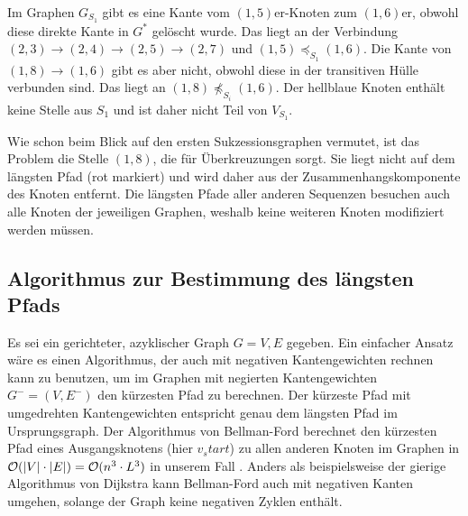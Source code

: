 \begin{center}
\end{center}

\vspace{-5pt}

Im Graphen $G_{S_1}$ gibt es eine Kante vom $(1,5)$er-Knoten zum $(1,6)$er, obwohl diese direkte Kante in $G^{*}$ gelöscht wurde. Das liegt an der Verbindung $(2,3) \rightarrow (2,4) \rightarrow (2,5) \rightarrow (2,7)$ und $(1,5) \preceq_{S_1} (1,6)$. Die Kante von $(1,8) \rightarrow (1,6)$ gibt es aber nicht, obwohl diese in der transitiven Hülle verbunden sind. Das liegt an $(1,8) \npreceq_{S_i} (1,6)$. Der hellblaue Knoten enthält keine Stelle aus $S_1$ und ist daher nicht Teil von $V_{S_1}$.

Wie schon beim Blick auf den ersten Sukzessionsgraphen vermutet, ist das Problem die Stelle $(1,8)$, die für Überkreuzungen sorgt. Sie liegt nicht auf dem längsten Pfad (rot markiert) und wird daher aus der Zusammenhangskomponente des Knoten entfernt. Die längsten Pfade aller anderen Sequenzen besuchen auch alle Knoten der jeweiligen Graphen, weshalb keine weiteren Knoten modifiziert werden müssen.

\subsection{Algorithmus zur Bestimmung des längsten Pfads}

Es sei ein gerichteter, azyklischer Graph $G = V,E$ gegeben. Ein einfacher Ansatz wäre es einen Algorithmus, der auch mit negativen Kantengewichten rechnen kann zu benutzen, um im Graphen mit negierten Kantengewichten $G^{-} = (V,E^{-})$ den kürzesten Pfad zu berechnen. Der kürzeste Pfad mit umgedrehten Kantengewichten entspricht genau dem längsten Pfad im Ursprungsgraph. Der Algorithmus von Bellman-Ford berechnet den kürzesten Pfad eines Ausgangsknotens (hier $v_start$) zu allen anderen Knoten im Graphen in $\mathcal{O}(|V|\cdot |E|) = \mathcal{O}(n^3\cdot L^3)$ in unserem Fall \cite[S.651ff.]{clrs09}. Anders als beispielsweise der gierige Algorithmus von Dijkstra kann Bellman-Ford auch mit negativen Kanten umgehen, solange der Graph keine negativen Zyklen enthält. 

